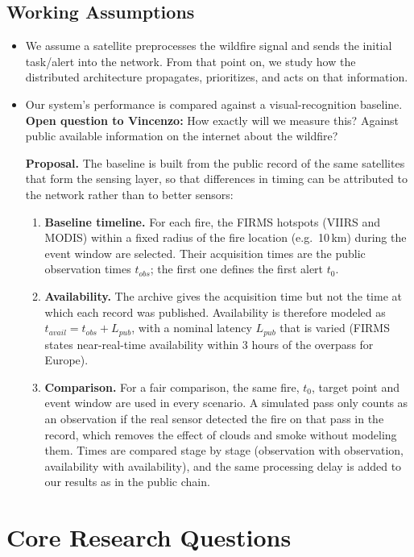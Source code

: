 \documentclass[11pt]{article}
\newcommand{\vincenzoq}[1]{\textcolor{vincenzoq}{\textbf{Open question to Vincenzo:}} #1}
\begin{document}
\subsection{Working Assumptions}\label{sec:baseline}
\begin{itemize}[leftmargin=1.2cm]
    \item We assume a satellite preprocesses the wildfire signal and sends the initial task/alert into the network. From that point on, we study how the distributed architecture propagates, prioritizes, and acts on that information.
    \item Our system's performance is compared against a visual-recognition baseline. \vincenzoq{How exactly will we measure this? Against public available information on the internet about the wildfire?}

    \textbf{Proposal.} The baseline is built from the public record of the same satellites that form the sensing layer, so that differences in timing can be attributed to the network rather than to better sensors:
    \begin{enumerate}
        \item \textbf{Baseline timeline.} For each fire, the FIRMS hotspots (VIIRS and MODIS) within a fixed radius of the fire location (e.g.\ 10\,km) during the event window are selected. Their acquisition times are the public observation times $t_{obs}$; the first one defines the first alert $t_0$. 
        \item \textbf{Availability.} The archive gives the acquisition time but not the time at which each record was published. Availability is therefore modeled as $t_{avail} = t_{obs} + L_{pub}$, with a nominal latency $L_{pub}$ that is varied (FIRMS states near-real-time availability within 3 hours of the overpass for Europe).
        \item \textbf{Comparison.} For a fair comparison, the same fire, $t_0$, target point and event window are used in every scenario. A simulated pass only counts as an observation if the real sensor detected the fire on that pass in the record, which removes the effect of clouds and smoke without modeling them. Times are compared stage by stage (observation with observation, availability with availability), and the same processing delay is added to our results as in the public chain.
    \end{enumerate}
\end{itemize}

\section{Core Research Questions}
\end{document}
